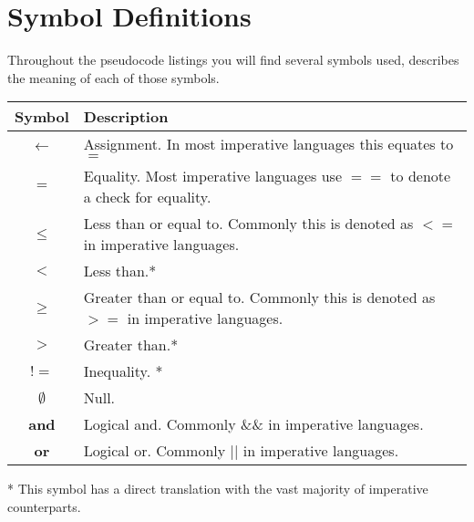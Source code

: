 \documentclass[10pt,oneside,a4paper]{report}
\begin{document}
\chapter{Symbol Definitions}
Throughout the pseudocode listings you will find several symbols used,  describes the meaning of each of those symbols.

\begin{tabular}[t]{|c|l|}
\hline
\textbf{Symbol} & \textbf{Description} \\
\hline
$\leftarrow$ & Assignment. In most imperative languages this equates to $=$ \\
\hline
$=$ & Equality. Most imperative languages use $==$ to denote a check for equality. \\
\hline
$\leq$ & Less than or equal to. Commonly this is denoted as $<=$ in imperative languages. \\
\hline
$<$ & Less than.* \\
\hline
$\geq$ & Greater than or equal to. Commonly this is denoted as $>=$ in imperative languages. \\
\hline
$>$ & Greater than.* \\
\hline
$!=$ & Inequality. * \\
\hline
$\emptyset$ & Null. \\
\hline
\textbf{and} & Logical and. Commonly \&\& in imperative languages. \\
\hline
\textbf{or} & Logical or. Commonly || in imperative languages. \\ %
\hline
\end{tabular}

* This symbol has a direct translation with the vast majority of imperative counterparts.
\end{document}
